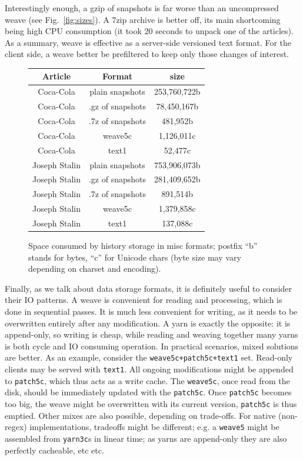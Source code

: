 \documentclass{acm_proc_article-sp}
\begin{document}
Interestingly enough, a gzip of
snapshots is far worse than an uncompressed weave (see
Fig.~\ref{fig:sizes}). A
7zip archive is better off, its main shortcoming being high CPU
consumption (it took 20 seconds to unpack one of the articles).
As a summary, weave is effective as a server-side versioned
text format. For the client side, a weave better be prefiltered
to keep only those changes of interest.


\begin{figure} \label{tab:sizes}
\begin{tabular}{|c|c|c|}
\hline
Article & Format & size \\
\hline
Coca-Cola & plain snapshots & 253,760,722b \\
Coca-Cola & .gz of snapshots & 78,450,167b \\
Coca-Cola & .7z of snapshots & 481,952b \\
Coca-Cola & weave5c & 1,126,011c \\
Coca-Cola & text1 & 52,477c \\
Joseph Stalin & plain snapshots & 753,906,073b \\
Joseph Stalin & .gz of snapshots & 281,409,652b \\
Joseph Stalin & .7z of snapshots & 891,514b\\
Joseph Stalin & weave5c & 1,379,858c \\
Joseph Stalin & text1 & 137,088c \\
\hline
\end{tabular}
\caption{Space consumed by history storage in misc formats; postfix ``b'' stands for bytes, ``c'' for Unicode chars (byte size may vary depending on charset and encoding).}
\end{figure}

Finally, as we talk about data storage formats, it is
definitely useful to consider their IO patterns. A weave
is convenient for reading and processing, which is done in
sequential passes. It is much less convenient for writing,
as it needs to be overwritten entirely after any
modification. A yarn is exactly the opposite: it is
append-only, so writing is cheap, while reading and
weaving together many yarns is both cycle and IO
consuming operation.
In practical scenarios, mixed solutions are better.
As an example, consider the {\tt weave5c+patch5c+text1} set.
Read-only clients may be served with {\tt text1}. All
ongoing modifications might be appended to {\tt patch5c},
which thus acts as a write cache. The {\tt weave5c}, once
read from the disk, should be immediately  updated with
the {\tt patch5c}. Once {\tt patch5c} becomes too
big, the weave might be overwritten with its current
version, {\tt patch5c} is thus emptied. Other mixes are
also possible, depending on trade-offs. For native (non-regex)
implementations, tradeoffs might be different; e.g.
a {\tt weave5} might be assembled from {\tt yarn3c}s
in linear time; as yarns are append-only they are also
perfectly cacheable, etc etc.
\end{document}

